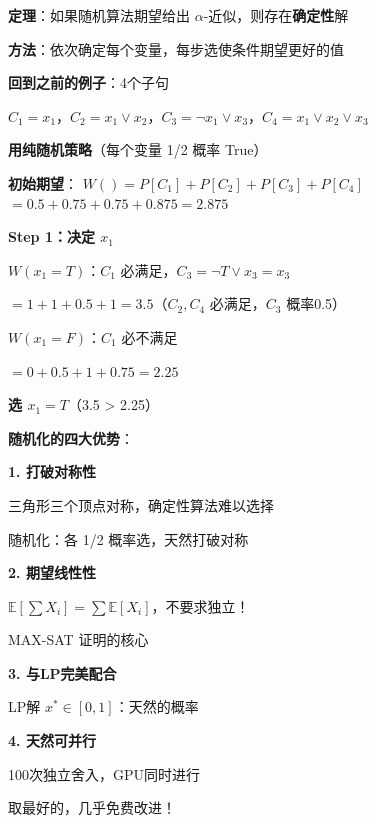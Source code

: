 \documentclass[12pt, a4paper]{ctexart}
\begin{document}
\begin{blackboard}

\textbf{定理}：如果随机算法期望给出 $\alpha$-近似，则存在\textbf{确定性}解

\textbf{方法}：依次确定每个变量，每步选使条件期望更好的值

\end{blackboard}

\begin{blackboard}

\textbf{回到之前的例子}：4个子句

$C_1 = x_1$，$C_2 = x_1 \lor x_2$，$C_3 = \neg x_1 \lor x_3$，$C_4 = x_1 \lor x_2 \lor x_3$

\textbf{用纯随机策略}（每个变量 1/2 概率 True）

\textbf{初始期望}：
$W() = P[C_1] + P[C_2] + P[C_3] + P[C_4]$
$= 0.5 + 0.75 + 0.75 + 0.875 = 2.875$

\textbf{Step 1：决定 $x_1$}

$W(x_1 = T)$：$C_1$ 必满足，$C_3 = \neg T \lor x_3 = x_3$

$= 1 + 1 + 0.5 + 1 = 3.5$（$C_2, C_4$ 必满足，$C_3$ 概率0.5）

$W(x_1 = F)$：$C_1$ 必不满足

$= 0 + 0.5 + 1 + 0.75 = 2.25$

\textbf{选 $x_1 = T$}（3.5 > 2.25）

\end{blackboard}


\begin{blackboard}[随机化与并行的天然契合]

\textbf{随机化的四大优势}：

\textbf{1. 打破对称性}

三角形三个顶点对称，确定性算法难以选择

随机化：各 1/2 概率选，天然打破对称

\textbf{2. 期望线性性}

$\mathbb{E}[\sum X_i] = \sum \mathbb{E}[X_i]$，不要求独立！

MAX-SAT 证明的核心

\textbf{3. 与LP完美配合}

LP解 $x^* \in [0,1]$：天然的概率

\textbf{4. 天然可并行}

100次独立舍入，GPU同时进行

取最好的，几乎免费改进！

\end{blackboard}
\end{document}
